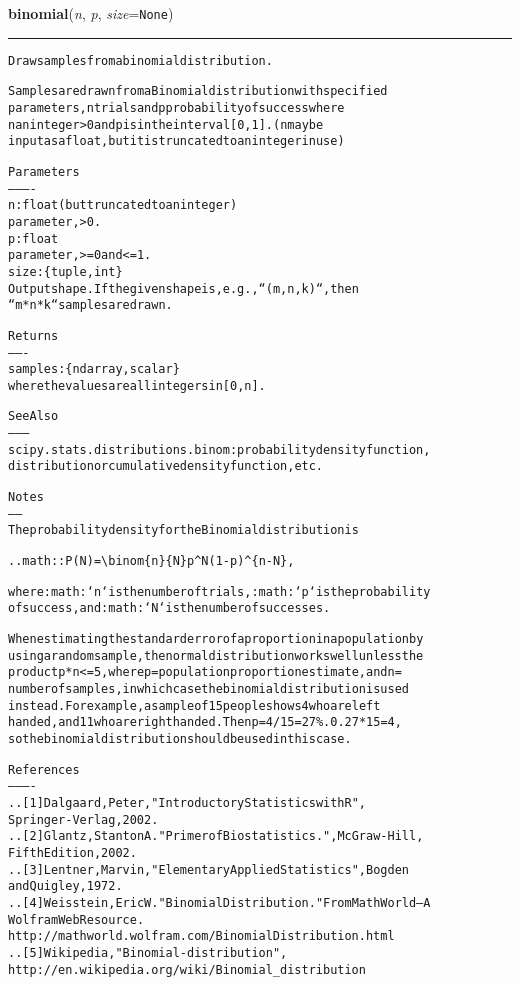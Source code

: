 \hspace{.8\funcindent}\begin{boxedminipage}{\funcwidth}

    \raggedright \textbf{binomial}(\textit{n}, \textit{p}, \textit{size}={\tt None})

    \vspace{-1.5ex}

    \rule{\textwidth}{0.5\fboxrule}
\setlength{\parskip}{2ex}
\begin{alltt}
Draw samples from a binomial distribution.

Samples are drawn from a Binomial distribution with specified
parameters, n trials and p probability of success where
n an integer {\textgreater} 0 and p is in the interval [0,1]. (n may be
input as a float, but it is truncated to an integer in use)

Parameters
----------
n : float (but truncated to an integer)
        parameter, {\textgreater} 0.
p : float
        parameter, {\textgreater}= 0 and {\textless}=1.
size : \{tuple, int\}
    Output shape.  If the given shape is, e.g., ``(m, n, k)``, then
    ``m * n * k`` samples are drawn.

Returns
-------
samples : \{ndarray, scalar\}
          where the values are all integers in  [0, n].

See Also
--------
scipy.stats.distributions.binom : probability density function,
    distribution or cumulative density function, etc.

Notes
-----
The probability density for the Binomial distribution is

.. math:: P(N) = {\textbackslash}binom\{n\}\{N\}p{\textasciicircum}N(1-p){\textasciicircum}\{n-N\},

where :math:`n` is the number of trials, :math:`p` is the probability
of success, and :math:`N` is the number of successes.

When estimating the standard error of a proportion in a population by
using a random sample, the normal distribution works well unless the
product p*n {\textless}=5, where p = population proportion estimate, and n =
number of samples, in which case the binomial distribution is used
instead. For example, a sample of 15 people shows 4 who are left
handed, and 11 who are right handed. Then p = 4/15 = 27\%. 0.27*15 = 4,
so the binomial distribution should be used in this case.

References
----------
.. [1] Dalgaard, Peter, "Introductory Statistics with R",
       Springer-Verlag, 2002.
.. [2] Glantz, Stanton A. "Primer of Biostatistics.", McGraw-Hill,
       Fifth Edition, 2002.
.. [3] Lentner, Marvin, "Elementary Applied Statistics", Bogden
       and Quigley, 1972.
.. [4] Weisstein, Eric W. "Binomial Distribution." From MathWorld--A
       Wolfram Web Resource.
       http://mathworld.wolfram.com/BinomialDistribution.html
.. [5] Wikipedia, "Binomial-distribution",
       http://en.wikipedia.org/wiki/Binomial\_distribution


\end{alltt}
\end{boxedminipage}
